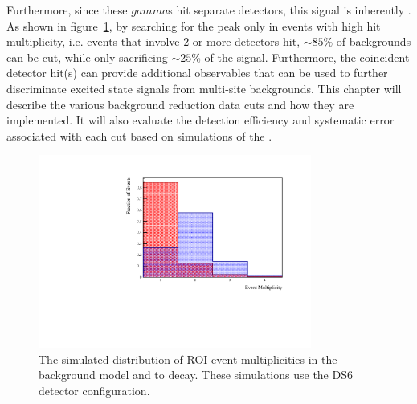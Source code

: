 \documentclass[/main.tex]{subfiles}
\begin{document}
Furthermore, since these $gamma$s hit separate detectors, this signal is inherently \msmd.
As shown in figure~\ref{fig:multhist}, by searching for the peak only in events with high hit multiplicity, i.e. events that involve 2 or more detectors hit, $\sim85\%$ of backgrounds can be cut, while only sacrificing $\sim25$\% of the signal.
Furthermore, the coincident detector hit(s) can provide additional observables that can be used to further discriminate excited state signals from multi-site backgrounds.
This chapter will describe the various background reduction data cuts and how they are implemented.
It will also evaluate the detection efficiency and systematic error associated with each cut based on simulations of the \MJD.

\begin{figure}[h]
  \centering
  \includegraphics[width=0.8\textwidth]{MultHist}
  \caption[Event Multiplicity in E.S. decay and BG model simulations]{\label{fig:multhist}
    The simulated distribution of ROI event multiplicities in the background model and \bbes to  decay. These simulations use the DS6 detector configuration.}
\end{figure}
\end{document}
